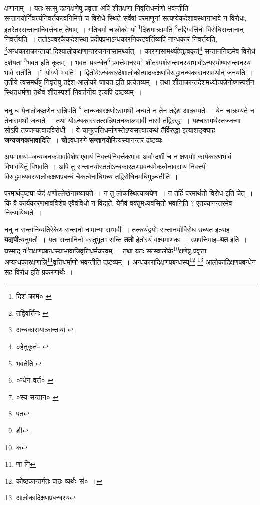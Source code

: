 \documentclass[article,12pt,a4paper]{memoir}
\begin{document}
	क्षणानाम् । यतः सत्सु दहनक्षणेषु प्रवृत्ता अपि शीतक्षणा निवृत्तिधर्माणो भवन्तीति सन्तानयोर्निवर्त्त्यनिवर्त्तकत्वनिमित्ते च विरोधे स्थिते सर्वेषां परमाणूनां सत्यप्येकदेशावस्थानाभावे न विरोधः, इतरेतरसन्तानानिवर्त्तनात् तेषाम् । गतिधर्मा चालोको यां \footnote{दिशं क्राम० \cite{dp-msC}}दिशमाक्रामति \footnote{तद्विवर्त्तिनः \cite{dp-msA}}तद्दिग्वर्त्तिनो विरोधिसन्तानान् निवर्त्तयति । ततोऽपवरकैकदेशस्था प्रदीपप्रभाऽन्धकारनिकटवर्त्तिव्यपि नान्धकारं निवर्त्तयति, \footnote{अन्धकारायाक्रान्तायां \cite{dp-msA}}अन्धकाराक्रान्तायां दिश्यालोकक्षणान्तरजननासामर्थ्यात् । कारणासामर्थ्यहेतुत्वकृतं\footnote{०हेतुकृतं--\cite{dp-msA} \cite{dp-edP} \cite{dp-edH} \cite{dp-edE} \cite{dp-edN}} सन्ताननिष्ठमेव विरोधं दर्शयता \footnote{भवतेति \cite{dp-edP} \cite{dp-edH}}भवत इति कृतम् । भवतः प्रबन्धेन\footnote{०न्धेन वर्त्त० \cite{dp-msA} \cite{dp-msB} \cite{dp-msD} \cite{dp-edP} \cite{dp-edH} \cite{dp-edE} \cite{dp-edN}} प्रवर्त्तमानस्य\footnote{०स्य सन्तान० \cite{dp-msC}} शीतस्पर्शसन्तानस्याभावोऽन्यस्योष्णसन्तानस्य भावे सतीति ।” योग्यो भवति । द्वितीयेऽन्धकारदेशालोकोत्पादकक्षणविरुद्धानन्धकारानसमर्थान् जनयति । तृतीये त्वसमर्थेषु निवृत्तेषु तद्देश आलोको जायत इति प्रत्येतव्यम् । तथा शीताक्रान्तदेशमध्योत्पन्नेनोष्णस्पर्शेन स्थितधर्मणा तथैव शीतस्पर्शो निवर्त्तनीय इत्यपि द्रष्टव्यम् ।
	\pend
      

	  \pstart ननु च येनालोकक्षणेन सन्निपति \footnote{पत} तान्धकारक्षणोऽसमर्थो जन्यते न तेन तद्देश आक्रम्यते । येन चाक्रम्यते न तेनासमर्थो जन्यते । तथा योऽन्धकारस्तत्सन्निपतनकालभावी नासौ तद्विरुद्धः । यश्चासमर्थस्तज्जन्मा सोऽपि तज्जन्यत्वादविरोधी । ये चानुत्पत्तिधर्माणस्तेऽप्यसत्त्वात्कथं तैर्विरुद्धा इत्याशङ्क्याह--\textbf{जन्यजनकभावादि}ति । \textbf{चो}ऽवधारणे \textbf{सन्तानयो}रित्यस्यानन्तरं द्रष्टव्यः ।
	\pend
      

	  \pstart अयमाशयः--जन्यजनकभावविशेष एवायं निवर्त्त्यनिवर्त्तकभावः अर्वाग्दर्शी च न क्षणयोः कार्यकारणभावं विभावयितुं विभवति । अपि तु सन्तानयोस्ततोऽन्धकारक्षणप्रबन्धमेकत्वेनावसाय निवर्त्त्यं विरुद्धमध्यवस्यालोकक्षणप्रबन्धं चैकत्वेनाधिमच्य तद्विरोधिनमधिमुञ्चतीति ।
	\pend
      

	  \pstart परमार्थदृष्ट्या चेदं क्षणोल्लेखेनाख्यायते । न तु लोकस्थित्याश्रयेण । न तर्हि परमार्थतो विरोध इति चेत् । किं वै कार्यकारणभावविशेष एवैवंविधो न विद्यते, येनैवं वक्तुमध्यवसितो भवानिति ? एतच्चानन्तरमेव निरूपयिष्यते ।
	\pend
      

	  \pstart ननु न सन्तानिव्यतिरेकेण सन्तानो नामान्यः सम्भवी । तत्कथं\leavevmode{}द्वयोः सन्तानयोर्विरोध उच्यत इत्याह \textbf{यद्यपी}त्यनुमतौ । यतः सन्तानिनो वस्तुभूताः सन्ति \textbf{ततो} हेतोरयं वक्ष्यमाणकः । उपपत्तिमाह--\textbf{यत} इति । यस्माद् ग\footnote{शी}तक्षणप्रबन्धस्याभावान्निवृत्तिधर्मकत्वम् । तथा यतः सत्स्वालोके\footnote{क}क्षणेषु प्रवृत्ता अप्यन्धकारक्षणान्नि\footnote{णा नि}वृत्तिधर्माणो भवन्तीति द्रष्टव्यम् । अन्धकारादिक्षणप्रबन्धस्य\footnote{कोष्ठकान्तर्गतः पाठः व्यर्थः--सं० ।} \footnote{आलोकादिक्षणप्रबन्धस्य} आलोकादिक्षणप्रबन्धेन सह विरोध इति प्रकरणार्थः ।
	\pend
      \leavevmode{}
	  \bigskip
	  \begingroup
	
\end{document}
